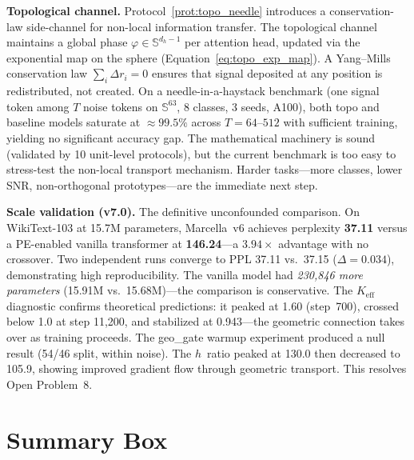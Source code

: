\documentclass[11pt,a4paper]{article}
\theoremstyle{definition}
\theoremstyle{remark}
\newcommand{\Sphere}{\mathbb{S}}
\begin{document}
\medskip

\textbf{Topological channel.} 
Protocol~\ref{prot:topo_needle} introduces a conservation-law 
side-channel for non-local information transfer. The topological 
channel maintains a global phase $\varphi \in \Sphere^{d_h - 1}$ 
per attention head, updated via the exponential map on the sphere 
(Equation~\ref{eq:topo_exp_map}). A Yang--Mills conservation law 
$\sum_i \Delta r_i = 0$ ensures that signal deposited at any 
position is redistributed, not created. On a needle-in-a-haystack 
benchmark (one signal token among $T$ noise tokens on 
$\Sphere^{63}$, 8 classes, 3 seeds, A100), both topo and 
baseline models saturate at ${\approx}99.5\%$ across $T = 64$--$512$ 
with sufficient training, yielding no significant accuracy gap. 
The mathematical machinery is sound (validated by 10 unit-level 
protocols), but the current benchmark is too easy to stress-test 
the non-local transport mechanism. Harder tasks---more classes, 
lower SNR, non-orthogonal prototypes---are the immediate next step.

\medskip

\textbf{Scale validation (v7.0).} The definitive unconfounded comparison. 
On WikiText-103 at 15.7M parameters, Marcella~v6 achieves perplexity 
\textbf{37.11} versus a PE-enabled vanilla transformer at 
\textbf{146.24}---a \textbf{$3.94\times$} advantage with no crossover. 
Two independent runs converge to PPL 37.11 vs.\ 37.15 ($\Delta = 0.034$), 
demonstrating high reproducibility. The vanilla model had 
\emph{230{,}846 more parameters} (15.91M vs.\ 15.68M)---the comparison 
is conservative. The $K_{\mathrm{eff}}$ diagnostic confirms theoretical 
predictions: it peaked at 1.60 (step~700), crossed below 1.0 at step 
11{,}200, and stabilized at 0.943---the geometric connection takes 
over as training proceeds. The geo\_gate warmup experiment produced a 
null result (54/46 split, within noise). The $h$~ratio peaked at 130.0 
then decreased to 105.9, showing improved gradient flow through 
geometric transport. This resolves Open Problem~8.

\section*{Summary Box}\label{sec:summary_box}
\end{document}
